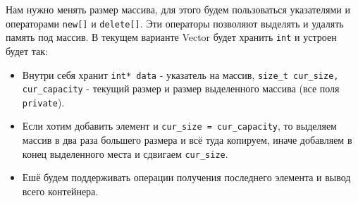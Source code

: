 Нам нужно менять размер массива, для этого будем пользоваться указателями и операторами \texttt{new[]} и \texttt{delete[]}. Эти операторы позволяют выделять и удалять память под массив. В текущем варианте Vector будет хранить \texttt{int} и устроен будет так:
\begin{itemize}
    \item Внутри себя хранит \texttt{int* data} - указатель на массив, \texttt{size_t cur_size, cur_capacity} - текущий размер и размер выделенного массива (все поля \texttt{private}).
    \item Если хотим добавить элемент и \texttt{cur_size = cur_capacity}, то выделяем массив в два раза большего размера и всё туда копируем, иначе добавляем в конец выделенного места и сдвигаем \texttt{cur_size}.
    \item Ешё будем поддерживать операции получения последнего элемента и вывод всего контейнера.
\end{itemize}
